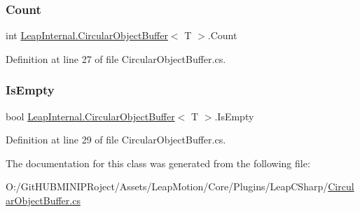 \mbox{\label{class_leap_internal_1_1_circular_object_buffer_a06a299b4010edacd5c7f4187f9d0c9f5}} 
\subsubsection{\texorpdfstring{Count}{Count}}
{\footnotesize\ttfamily int \mbox{\hyperlink{class_leap_internal_1_1_circular_object_buffer}{Leap\+Internal.\+Circular\+Object\+Buffer}}$<$ T $>$.Count\hspace{0.3cm}{\ttfamily [get]}}



Definition at line 27 of file Circular\+Object\+Buffer.\+cs.

\mbox{\label{class_leap_internal_1_1_circular_object_buffer_a897abcef25602b14de45a6eb13ed626b}} 
\subsubsection{\texorpdfstring{IsEmpty}{IsEmpty}}
{\footnotesize\ttfamily bool \mbox{\hyperlink{class_leap_internal_1_1_circular_object_buffer}{Leap\+Internal.\+Circular\+Object\+Buffer}}$<$ T $>$.Is\+Empty\hspace{0.3cm}{\ttfamily [get]}}



Definition at line 29 of file Circular\+Object\+Buffer.\+cs.



The documentation for this class was generated from the following file\+:\begin{DoxyCompactItemize}
\item 
O\+:/\+Git\+H\+U\+B\+M\+I\+N\+I\+P\+Roject/\+Assets/\+Leap\+Motion/\+Core/\+Plugins/\+Leap\+C\+Sharp/\mbox{\hyperlink{_circular_object_buffer_8cs}{Circular\+Object\+Buffer.\+cs}}\end{DoxyCompactItemize}
